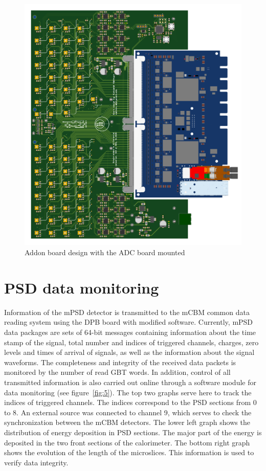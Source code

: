 \documentclass[a4paper,11pt]{article}
\begin{document}
\begin{figure}[htbp]
	\centering
	\includegraphics[width=.5\textwidth]{ADC_addon.png}
	\caption{\label{fig:4} Addon board design with the ADC board mounted}
\end{figure}

\section{PSD data monitoring}
Information of the mPSD detector is transmitted to the mCBM common data reading system using the DPB board with modified software. Currently, mPSD data packages are sets of 64-bit messages containing information about the time stamp of the signal, total number and indices of triggered channels, charges, zero levels and times of arrival of signals, as well as the information about the signal waveforms. The completeness and integrity of the received data packets is monitored by the number of read GBT words. In addition, control of all transmitted information is also carried out online through a software module for data monitoring (see figure~\ref{fig:5}). The top two graphs serve here to track the indices of triggered channels. The indices correspond to the PSD sections from 0 to 8. An external source was connected to channel 9, which serves to check the synchronization between the mCBM detectors. The lower left graph shows the distribution of energy deposition in PSD sections. The major part of the energy is deposited in the two front sections of the calorimeter. The bottom right graph shows the evolution of the length of the microslices. This information is used to verify data integrity.
\end{document}
